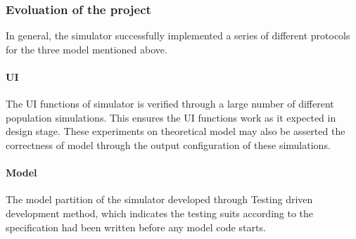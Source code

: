 \subsubsection{Evoluation of the project}
\par
In general, the simulator successfully implemented a series of different protocols for the three model mentioned above.

\paragraph{UI} The UI functions of simulator is verified through a large number of different population simulations. This ensures the UI functions work as it expected in design stage.
These experiments on theoretical model may also be asserted the correctness of model through the output configuration of these simulations.

\paragraph{Model} The model partition of the simulator developed through Testing driven development method, which indicates the testing suits according to the specification had been written before any
model code starts.
